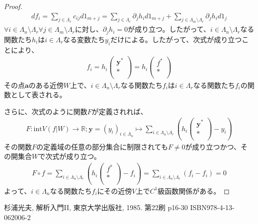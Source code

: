 \documentclass[dvipdfmx]{jsarticle}
\begin{document}
\begin{proof}
\begin{align*}
df_{i} = \sum_{j \in \varLambda_{r}} {c_{ij}d1_{m + j}} = \sum_{j \in \varLambda_{r}} {\partial_{j}h_{i}d1_{m + j}} + \sum_{j \in \varLambda_{m} \setminus \varLambda_{r}} {\partial_{j}h_{i}d1_{j}}
\end{align*}
$\forall i \in \varLambda_{n} \setminus \varLambda_{r}\forall j \in \varLambda_{m} \setminus \varLambda_{r}$に対し、$\partial_{j}h_{i} = 0$が成り立つ。したがって、$i \in \varLambda_{n} \setminus \varLambda_{r}$なる関数たち$h_{i}$は$i \in \varLambda_{r}$なる変数たち$y_{i}$だけによる。したがって、次式が成り立つことにより、
\begin{align*}
f_{i} = h_{i}\begin{pmatrix}
\mathbf{y}^{*} \\
* \\
\end{pmatrix} = h_{i}\begin{pmatrix}
f^{*} \\
* \\
\end{pmatrix}
\end{align*}
その点$\mathbf{a}$のある近傍$W$上で、$i \in \varLambda_{n} \setminus \varLambda_{r}$なる関数たち$f_{i}$は$i \in \varLambda_{r}$なる関数たち$f_{i}$の関数として表される。\par
さらに、次式のように関数$F$が定義されれば、
\begin{align*}
F:\mathrm{int}{V\left( f|W \right)} \rightarrow \mathbb{R};\mathbf{y} = \left( y_{i} \right)_{i \in \varLambda_{n}} \mapsto \sum_{i \in \varLambda_{n} \setminus \varLambda_{r}} \left( h_{i}\begin{pmatrix}
\mathbf{y}^{*} \\
* \\
\end{pmatrix} - y_{i} \right)
\end{align*}
その関数$F$の定義域の任意の部分集合に制限されても$F \neq 0$が成り立つかつ、その開集合$W$で次式が成り立つ。
\begin{align*}
F \circ f = \sum_{i \in \varLambda_{n} \setminus \varLambda_{r}} \left( h_{i}\begin{pmatrix}
f^{*} \\
* \\
\end{pmatrix} - f_{i} \right) = \sum_{i \in \varLambda_{n} \setminus \varLambda_{r}} \left( f_{i} - f_{i} \right) = 0
\end{align*}
よって、$i \in \varLambda_{n}$なる関数たち$f_{i}$にその近傍$V$上で$C^{1}$級函数関係がある。
\end{proof}
\begin{thebibliography}{50}
  杉浦光夫, 解析入門II, 東京大学出版社, 1985. 第22刷 p16-30 ISBN978-4-13-062006-2
\end{thebibliography}
\end{document}
